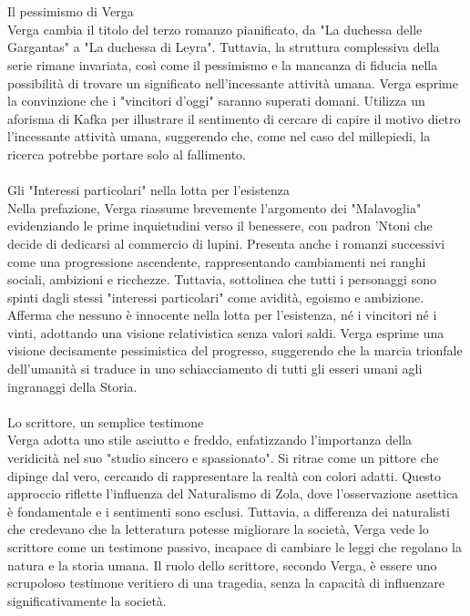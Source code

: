 \documentclass{report}
\begin{document}
\\
\\
Il pessimismo di Verga
\\
Verga cambia il titolo del terzo romanzo pianificato, da "La duchessa delle Gargantas" a "La duchessa di Leyra". Tuttavia, la struttura complessiva della serie rimane invariata, così come il pessimismo e la mancanza di fiducia nella possibilità di trovare un significato nell'incessante attività umana. Verga esprime la convinzione che i "vincitori d'oggi" saranno superati domani. Utilizza un aforisma di Kafka per illustrare il sentimento di cercare di capire il motivo dietro l'incessante attività umana, suggerendo che, come nel caso del millepiedi, la ricerca potrebbe portare solo al fallimento.
\\
\\
Gli "Interessi particolari" nella lotta per l'esistenza
\\
Nella prefazione, Verga riassume brevemente l'argomento dei "Malavoglia" evidenziando le prime inquietudini verso il benessere, con padron ’Ntoni che decide di dedicarsi al commercio di lupini. Presenta anche i romanzi successivi come una progressione ascendente, rappresentando cambiamenti nei ranghi sociali, ambizioni e ricchezze. Tuttavia, sottolinea che tutti i personaggi sono spinti dagli stessi "interessi particolari" come avidità, egoismo e ambizione. Afferma che nessuno è innocente nella lotta per l'esistenza, né i vincitori né i vinti, adottando una visione relativistica senza valori saldi. Verga esprime una visione decisamente pessimistica del progresso, suggerendo che la marcia trionfale dell'umanità si traduce in uno schiacciamento di tutti gli esseri umani agli ingranaggi della Storia.
\\
\\
Lo scrittore, un semplice testimone
\\
Verga adotta uno stile asciutto e freddo, enfatizzando l'importanza della veridicità nel suo "studio sincero e spassionato". Si ritrae come un pittore che dipinge dal vero, cercando di rappresentare la realtà con colori adatti. Questo approccio riflette l'influenza del Naturalismo di Zola, dove l'osservazione asettica è fondamentale e i sentimenti sono esclusi. Tuttavia, a differenza dei naturalisti che credevano che la letteratura potesse migliorare la società, Verga vede lo scrittore come un testimone passivo, incapace di cambiare le leggi che regolano la natura e la storia umana. Il ruolo dello scrittore, secondo Verga, è essere uno scrupoloso testimone veritiero di una tragedia, senza la capacità di influenzare significativamente la società.
\end{document}
